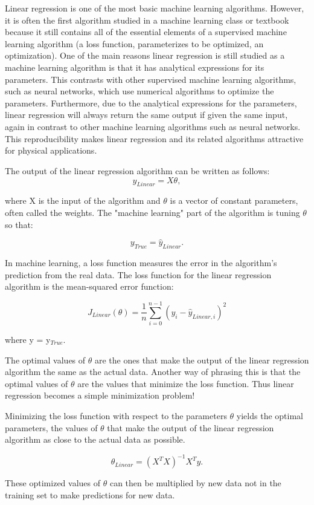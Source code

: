 Linear regression is one of the most basic machine learning algorithms. However, it is often the first algorithm studied in a machine learning class or textbook because it still contains all of the essential elements of a supervised machine learning algorithm (a loss function, parameterizes to be optimized, an optimization). One of the main reasons linear regression is still studied as a machine learning algorithm is that it has analytical expressions for its parameters. This contrasts with other supervised machine learning algorithms, such as neural networks, which use numerical algorithms to optimize the parameters. Furthermore, due to the analytical expressions for the parameters, linear regression will always return the same output if given the same input, again in contrast to other machine learning algorithms such as neural networks. This reproducibility makes linear regression and its related algorithms attractive for physical applications. 

The output of the linear regression algorithm can be written as follows: 
\begin{equation}
    \hat{y}_{Linear} = X\theta,
\end{equation}

where X is the input of the algorithm and $\theta$ is a vector of constant parameters, often called the weights. The "machine learning" part of the algorithm is tuning $\theta$ so that:

\begin{equation}
    y_{True} = \hat{y}_{Linear}.
\end{equation}

In machine learning, a loss function measures the error in the algorithm's prediction from the real data. The loss function for the linear regression algorithm is the mean-squared error function:

\begin{equation}
    J_{Linear}(\theta) = \frac{1}{n}\sum_{i=0}^{n-1} (y_i - \hat{y}_{Linear,i})^2
\end{equation}

where y = y$_{True}$.

The optimal values of $\theta$ are the ones that make the output of the linear regression algorithm the same as the actual data. Another way of phrasing this is that the optimal values of $\theta$ are the values that minimize the loss function. Thus linear regression becomes a simple minimization problem!

Minimizing the loss function with respect to the parameters $\theta$ yields the optimal parameters, the values of $\theta$ that make the output of the linear regression algorithm as close to the actual data as possible. 

\begin{equation}
    \theta_{Linear} = (X^TX)^{-1}X^Ty.
\end{equation}

These optimized values of $\theta$ can then be multiplied by new data not in the training set to make predictions for new data.

